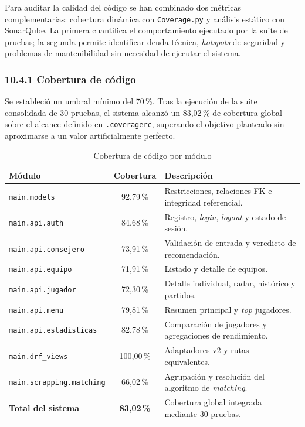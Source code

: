 Para auditar la calidad del código se han combinado dos métricas complementarias: cobertura dinámica con \texttt{Coverage.py} y análisis estático con SonarQube. La primera cuantifica el comportamiento ejecutado por la suite de pruebas; la segunda permite identificar deuda técnica, \textit{hotspots} de seguridad y problemas de mantenibilidad sin necesidad de ejecutar el sistema.


\subsubsection{10.4.1 Cobertura de código}
\label{subsec:cobertura}

Se estableció un umbral mínimo del 70\,\%. Tras la ejecución de la suite consolidada de 30 pruebas, el sistema alcanzó un 83{,}02\,\% de cobertura global sobre el alcance definido en \texttt{.coveragerc}, superando el objetivo planteado sin aproximarse a un valor artificialmente perfecto.

\begin{table}[H]
\centering
\caption{Cobertura de código por módulo}
\label{tab:cobertura}
\renewcommand{\arraystretch}{1.3}
\begin{tabular}{lcp{5.5cm}}
\hline
\textbf{Módulo} & \textbf{Cobertura} & \textbf{Descripción} \\
\hline
\texttt{main.models}              & 92{,}79\,\% & Restricciones, relaciones FK e integridad referencial. \\
\texttt{main.api.auth}            & 84{,}68\,\% & Registro, \textit{login}, \textit{logout} y estado de sesión. \\
\texttt{main.api.consejero}       & 73{,}91\,\% & Validación de entrada y veredicto de recomendación. \\
\texttt{main.api.equipo}          & 71{,}91\,\% & Listado y detalle de equipos. \\
\texttt{main.api.jugador}         & 72{,}30\,\% & Detalle individual, radar, histórico y partidos. \\
\texttt{main.api.menu}            & 79{,}81\,\% & Resumen principal y \textit{top} jugadores. \\
\texttt{main.api.estadisticas}    & 82{,}78\,\% & Comparación de jugadores y agregaciones de rendimiento. \\
\texttt{main.drf\_views}          & 100{,}00\,\% & Adaptadores v2 y rutas equivalentes. \\
\texttt{main.scrapping.matching}  & 66{,}02\,\% & Agrupación y resolución del algoritmo de \textit{matching}. \\
\hline
\textbf{Total del sistema}        & \textbf{83{,}02\,\%} & Cobertura global integrada mediante 30 pruebas. \\
\hline
\end{tabular}
\end{table}

